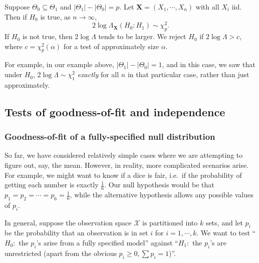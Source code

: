 \documentclass[a4paper]{article}
\begin{document}
\begin{thm}
  Suppose $\Theta_0 \subseteq \Theta_1$ and $|\Theta_1| - |\Theta_0| = p$. Let $\mathbf{X} = (X_1, \cdots, X_n)$ with all $X_i$ iid. Then if $H_0$ is true, as $n\to \infty$,
  \[
    2\log \Lambda_\mathbf{X}(H_0:H_1)\sim \chi_p^2.
  \]
  If $H_0$ is not true, then $2\log \Lambda$ tends to be larger. We reject $H_0$ if $2\log \Lambda > c$, where $c = \chi_p^2(\alpha)$ for a test of approximately size $\alpha$.
\end{thm}

For example, in our example above, $|\Theta_1| - |\Theta_0| = 1$, and in this case, we saw that under $H_0$, $2\log \Lambda \sim \chi_1^2$ \emph{exactly} for all $n$ in that particular case, rather than just approximately.

\subsection{Tests of goodness-of-fit and independence}
\subsubsection{Goodness-of-fit of a fully-specified null distribution}
So far, we have considered relatively simple cases where we are attempting to figure out, say, the mean. However, in reality, more complicated scenarios arise. For example, we might want to know if a dice is fair, i.e.\ if the probability of getting each number is exactly $\frac{1}{6}$. Our null hypothesis would be that $p_1 = p_2 = \cdots = p_6 = \frac{1}{6}$, while the alternative hypothesis allows any possible values of $p_i$.

In general, suppose the observation space $\mathcal{X}$ is partitioned into $k$ sets, and let $p_i$ be the probability that an observation is in set $i$ for $i = 1, \cdots, k$. We want to test ``$H_0:$ the $p_i$'s arise from a fully specified model'' against ``$H_1:$ the $p_i$'s are unrestricted (apart from the obvious $p_i \geq 0, \sum p_i = 1$)''.
\end{document}
